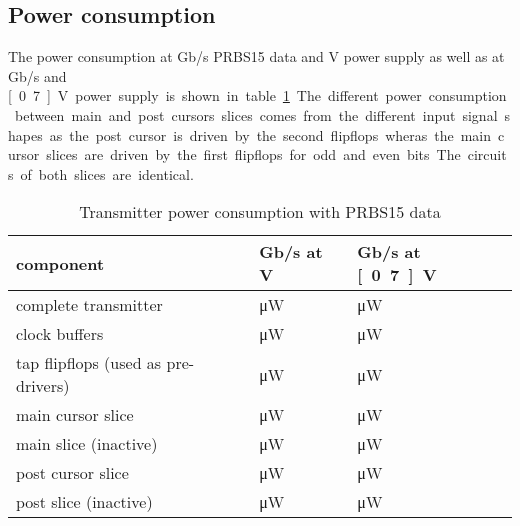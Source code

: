 \subsection{Power consumption}

The power consumption at \unit[10]{Gb/s} PRBS15 data and \unit[1]{V} power supply as well as at \unit[2]{Gb/s} and \unit[0.7]{V} power supply is shown in table \ref{tab:power_consumption_tx}. The different power consumption between main and post cursors slices comes from the different input signal shapes as the post cursor is driven by the second flipflops wheras the main cursor slices are driven by the first flipflops for odd and even bits. The circuits of both slices are identical.

\begin{table}[H]
  \centering %
  \begin{tabular}{l|l|l}
    component & \unit[10]{Gb/s} at \unit[1]{V} & \unit[2]{Gb/s} at \unit[0.7]{V}\\
    \hline
    complete transmitter &  \unit[37933]{\uW} & \unit[5720]{\uW}\\
    clock buffers & \unit[23523]{\uW} &  \unit[2221]{\uW}\\
    tap flipflops (used as pre-drivers) & \unit[3610]{\uW} &  \unit[390]{\uW}\\
    main cursor slice &  \unit[1239]{\uW} &  \unit[377]{\uW}\\
    main slice (inactive) &  \unit[1,548]{\uW} &  \unit[0,4]{\uW}\\
    post cursor slice &  \unit[1189]{\uW} &  \unit[423]{\uW}\\
    post slice (inactive) &  \unit[1,802]{\uW} &  \unit[0,4]{\uW}\\      
  \end{tabular}
  \caption{Transmitter power consumption with PRBS15 data}
  \label{tab:power_consumption_tx}
\end{table}
